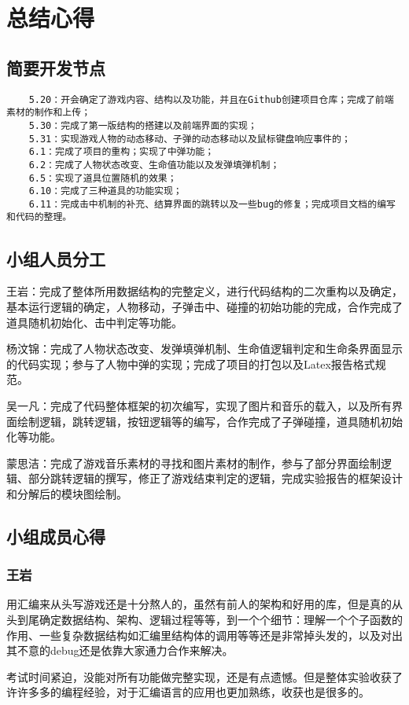 \chapter{总结心得}
\section{简要开发节点}
\begin{lstlisting}
    5.20：开会确定了游戏内容、结构以及功能，并且在Github创建项目仓库；完成了前端素材的制作和上传；
    5.30：完成了第一版结构的搭建以及前端界面的实现；
    5.31：实现游戏人物的动态移动、子弹的动态移动以及鼠标键盘响应事件的；
    6.1：完成了项目的重构；实现了中弹功能；
    6.2：完成了人物状态改变、生命值功能以及发弹填弹机制；
    6.5：实现了道具位置随机的效果；
    6.10：完成了三种道具的功能实现；
    6.11：完成击中机制的补充、结算界面的跳转以及一些bug的修复；完成项目文档的编写和代码的整理。
\end{lstlisting}
\section{小组人员分工}
王岩：完成了整体所用数据结构的完整定义，进行代码结构的二次重构以及确定，基本运行逻辑的确定，人物移动，子弹击中、碰撞的初始功能的完成，合作完成了道具随机初始化、击中判定等功能。
\par
杨汶锦：完成了人物状态改变、发弹填弹机制、生命值逻辑判定和生命条界面显示的代码实现；参与了人物中弹的实现；完成了项目的打包以及Latex报告格式规范。
\par
吴一凡：完成了代码整体框架的初次编写，实现了图片和音乐的载入，以及所有界面绘制逻辑，跳转逻辑，按钮逻辑等的编写，合作完成了子弹碰撞，道具随机初始化等功能。
\par
蒙思洁：完成了游戏音乐素材的寻找和图片素材的制作，参与了部分界面绘制逻辑、部分跳转逻辑的撰写，修正了游戏结束判定的逻辑，完成实验报告的框架设计和分解后的模块图绘制。
\section{小组成员心得}
\subsection{王岩}
用汇编来从头写游戏还是十分熬人的，虽然有前人的架构和好用的库，但是真的从头到尾确定数据结构、架构、逻辑过程等等，到一个个细节：理解一个个子函数的作用、一些复杂数据结构如汇编里结构体的调用等等还是非常掉头发的，以及对出其不意的debug还是依靠大家通力合作来解决。
\par
考试时间紧迫，没能对所有功能做完整实现，还是有点遗憾。但是整体实验收获了许许多多的编程经验，对于汇编语言的应用也更加熟练，收获也是很多的。
